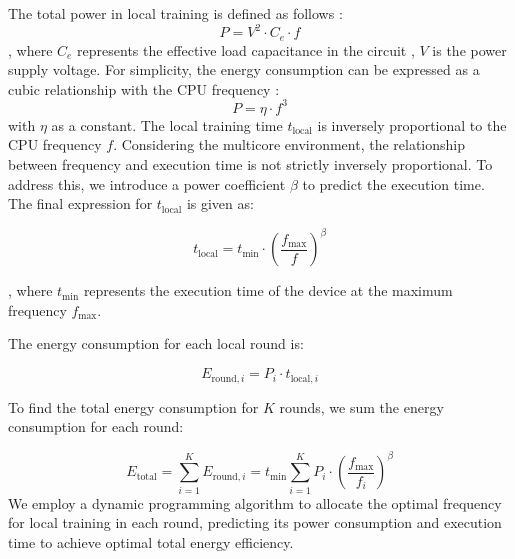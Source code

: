 \documentclass[journal]{IEEEtran}
\begin{document}
The total power in local training is defined as follows \cite{feng2021min}:
\begin{equation}
P=V^{2}\cdot C_e\cdot f
\end{equation}
, where $C_e$ represents the effective load capacitance in the circuit \cite{burd1996processor}, $V$ is the power supply voltage. For simplicity, the energy consumption can be expressed as a cubic relationship with the CPU frequency \cite{zhu2019energy}:
\begin{equation}
P=\eta\cdot f^3
\end{equation}
with $\eta$ as a constant.  The local training time \( t_{\text{local}} \) is inversely proportional to the CPU frequency \( f \). Considering the multicore environment, the relationship between frequency and execution time is not strictly inversely proportional. To address this, we introduce a power coefficient \( \beta \) to predict the execution time. The final expression for \( t_{\text{local}} \) is given as:

\begin{equation}
t_{\text{local}} = t_{\text{min}} \cdot \left( \frac{f_{\text{max}}}{f} \right)^\beta
\end{equation}

, where \( t_{\text{min}} \) represents the execution time of the device at the maximum frequency \( f_{\text{max}} \).

The energy consumption for each local round is:

\begin{equation}
E_{\text{round}, i} = P_i \cdot t_{\text{local}, i} 
\end{equation}

To find the total energy consumption for \( K \) rounds, we sum the energy consumption for each round:

\begin{equation}
E_{\text{total}} = \sum_{i=1}^{K} E_{\text{round}, i} = t_{\text{min}}\sum_{i=1}^{K} P_i  \cdot \left( \frac{f_{\text{max}}}{f_i} \right)^\beta
\end{equation}
We employ a dynamic programming algorithm to allocate the optimal frequency for local training in each round, predicting its power consumption and execution time to achieve optimal total energy efficiency.
\end{document}
